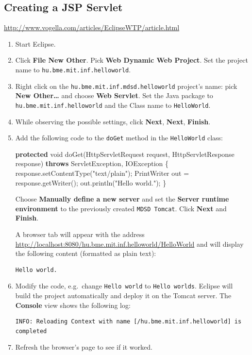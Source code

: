 \documentclass[]{report}
\newenvironment{Shaded}{}{}
\newcommand{\KeywordTok}[1]{\textcolor[rgb]{0.00,0.44,0.13}{\textbf{{#1}}}}
\newcommand{\DataTypeTok}[1]{\textcolor[rgb]{0.56,0.13,0.00}{{#1}}}
\newcommand{\StringTok}[1]{\textcolor[rgb]{0.25,0.44,0.63}{{#1}}}
\newcommand{\FunctionTok}[1]{\textcolor[rgb]{0.02,0.16,0.49}{{#1}}}
\newcommand{\NormalTok}[1]{{#1}}
\begin{document}
\subsection{Creating a JSP Servlet}

\url{http://www.vogella.com/articles/EclipseWTP/article.html}

\begin{enumerate}
\def\labelenumi{\arabic{enumi}.}
\item
  Start Eclipse.
\item
  Click \textbf{File \textbar{} New \textbar{} Other}. Pick \textbf{Web
  \textbar{} Dynamic Web Project}. Set the project name to
  \texttt{hu.bme.mit.inf.helloworld}.
\item
  Right click on the \texttt{hu.bme.mit.inf.mdsd.helloworld} project's
  name: pick \textbf{New \textbar{} Other\ldots{}} and choose
  \textbf{Web \textbar{} Servlet}. Set the Java package to
  \texttt{hu.bme.mit.inf.helloworld} and the Class name to
  \texttt{HelloWorld}.
\item
  While observing the possible settings, click \textbf{Next},
  \textbf{Next}, \textbf{Finish}.
\item
  Add the following code to the \texttt{doGet} method in the
  \texttt{HelloWorld} class:

\begin{Shaded}
\begin{Highlighting}[]
\KeywordTok{protected} \DataTypeTok{void} \FunctionTok{doGet}\NormalTok{(HttpServletRequest request, HttpServletResponse response) }
  \KeywordTok{throws} \NormalTok{ServletException, IOException \{}
  \NormalTok{response.}\FunctionTok{setContentType}\NormalTok{(}\StringTok{"text/plain"}\NormalTok{);}
  \NormalTok{PrintWriter out = response.}\FunctionTok{getWriter}\NormalTok{();}
  \NormalTok{out.}\FunctionTok{println}\NormalTok{(}\StringTok{"Hello world."}\NormalTok{);}
\NormalTok{\}}
\end{Highlighting}
\end{Shaded}

  Choose \textbf{Manually define a new server} and set the
  \textbf{Server runtime environment} to the previously created
  \texttt{MDSD Tomcat}. Click \textbf{Next} and \textbf{Finish}.

  A browser tab will appear with the address
  \url{http://localhost:8080/hu.bme.mit.inf.helloworld/HelloWorld} and
  will display the following content (formatted as plain text):

\begin{verbatim}
Hello world.
\end{verbatim}
\item
  Modify the code, e.g.~change \texttt{Hello world} to
  \texttt{Hello worlds}. Eclipse will build the project automatically
  and deploy it on the Tomcat server. The \textbf{Console} view shows
  the following log:

\begin{verbatim}
INFO: Reloading Context with name [/hu.bme.mit.inf.helloworld] is completed
\end{verbatim}
\item
  Refresh the browser's page to see if it worked.
\end{enumerate}
\end{document}

